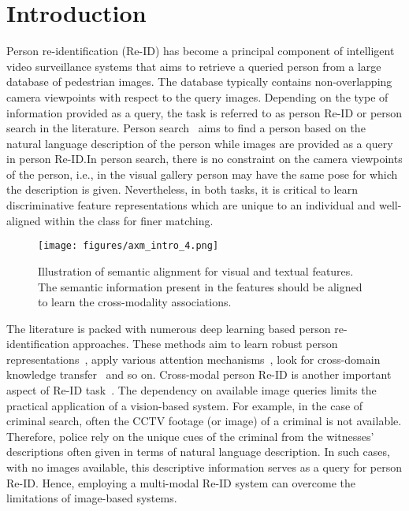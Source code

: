 \documentclass[10pt,twocolumn,letterpaper]{article}
\begin{document}
\section{Introduction}
Person re-identification (Re-ID) has become a principal component of intelligent video surveillance systems that aims to retrieve a queried person from a large database of pedestrian images. The database typically contains non-overlapping camera viewpoints with respect to the query images. Depending on the type of information provided as a query, the task is referred to as person Re-ID or person search in the literature. Person search~\cite{li2017person} aims to find a person based on the natural language description of the person while images are provided as a query in person Re-ID.In person search, there is no constraint on the camera viewpoints of the person, i.e., in the visual gallery person may have the same pose for which the description is given. Nevertheless, in both tasks, it is critical to learn discriminative feature representations which are unique to an individual and well-aligned within the class for finer matching.  
 
 \begin{figure}
\centering
        \texttt{[image: figures/axm\_intro\_4.png]}
        \footnotesize{\caption{Illustration of semantic alignment for visual and textual features. The semantic information present in the features should be aligned to learn the cross-modality associations.}}
    \label{axm_intro}
\end{figure}
 
 The literature is packed with numerous deep learning based person re-identification approaches. These methods aim to learn robust person representations~\cite{zhou2019omni,dai2019batch}, apply various attention mechanisms~\cite{Xia_2019_ICCV,Chen_2019_ICCV}, look for cross-domain knowledge transfer~\cite{Jing_2020_CVPR,Chen_2019_ICCV_cross} and so on. Cross-modal person Re-ID is another important aspect of Re-ID task~\cite{yan2018person,farooq2020convolutional,farooq2020IJCB,Lu_2020_CVPR,Jing_2020_CVPR}. The dependency on available image queries limits the practical application of a vision-based system. For example, in the case of criminal search, often the CCTV footage (or image) of a criminal is not available. Therefore, police rely on the unique cues of the criminal from the witnesses’ descriptions often given in terms of natural language description. In such cases, with no images available, this descriptive information serves as a query for person Re-ID. Hence, employing a multi-modal Re-ID system can overcome the limitations of image-based systems. 
 
\end{document}
